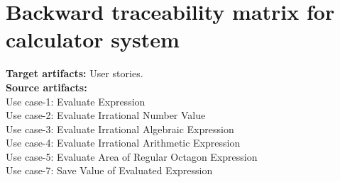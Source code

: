 \section{Backward traceability matrix for calculator system}
\begin{center}
\begin{table}[!ht]
\centering
{}
\caption{Backward Traceability Matrix}
\label{tab:my-table}
\end{table}
\end{center}
\textbf{Target artifacts:} User stories. \\
\textbf{Source artifacts:} \\
\indent Use case-1: Evaluate Expression\\  
\indent Use case-2: Evaluate Irrational Number Value\\
\indent Use case-3: Evaluate Irrational Algebraic Expression\\
\indent Use case-4: Evaluate Irrational Arithmetic Expression\\
\indent Use case-5: Evaluate Area of Regular Octagon Expression\\
\indent Use case-7: Save Value of Evaluated Expression\\